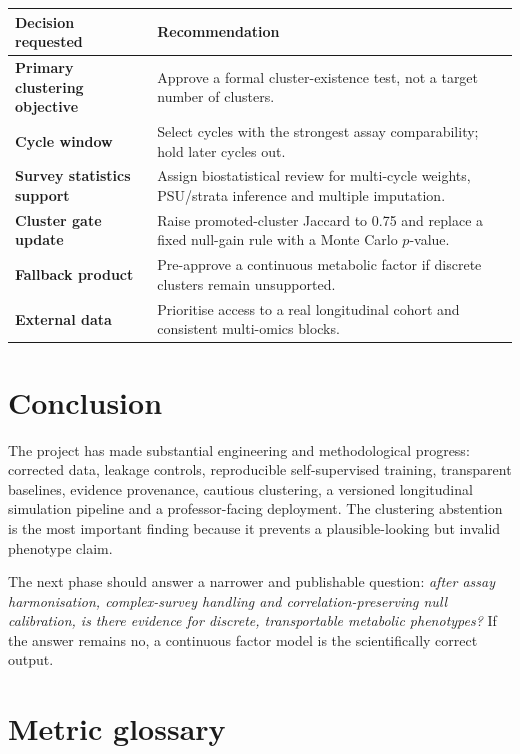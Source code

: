 \documentclass[11pt,a4paper]{article}
\begin{document}
\begin{table}[H]
\centering
\small
\begin{tabularx}{\textwidth}{>{\bfseries}p{34mm} X}
\toprule
Decision requested & Recommendation \\
\midrule
Primary clustering objective &
Approve a formal cluster-existence test, not a target number of clusters. \\
Cycle window &
Select cycles with the strongest assay comparability; hold later cycles out. \\
Survey statistics support &
Assign biostatistical review for multi-cycle weights, PSU/strata inference and
multiple imputation. \\
Cluster gate update &
Raise promoted-cluster Jaccard to 0.75 and replace a fixed null-gain rule with a
Monte Carlo \(p\)-value. \\
Fallback product &
Pre-approve a continuous metabolic factor if discrete clusters remain unsupported. \\
External data &
Prioritise access to a real longitudinal cohort and consistent multi-omics blocks. \\
\bottomrule
\end{tabularx}
\end{table}

\section{Conclusion}

The project has made substantial engineering and methodological progress:
corrected data, leakage controls, reproducible self-supervised training,
transparent baselines, evidence provenance, cautious clustering, a versioned
longitudinal simulation pipeline and a professor-facing deployment. The
clustering abstention is the most important finding because it prevents a
plausible-looking but invalid phenotype claim.

The next phase should answer a narrower and publishable question:
\emph{after assay harmonisation, complex-survey handling and
correlation-preserving null calibration, is there evidence for discrete,
transportable metabolic phenotypes?} If the answer remains no, a continuous
factor model is the scientifically correct output.

\appendix

\section{Metric glossary}
\end{document}
